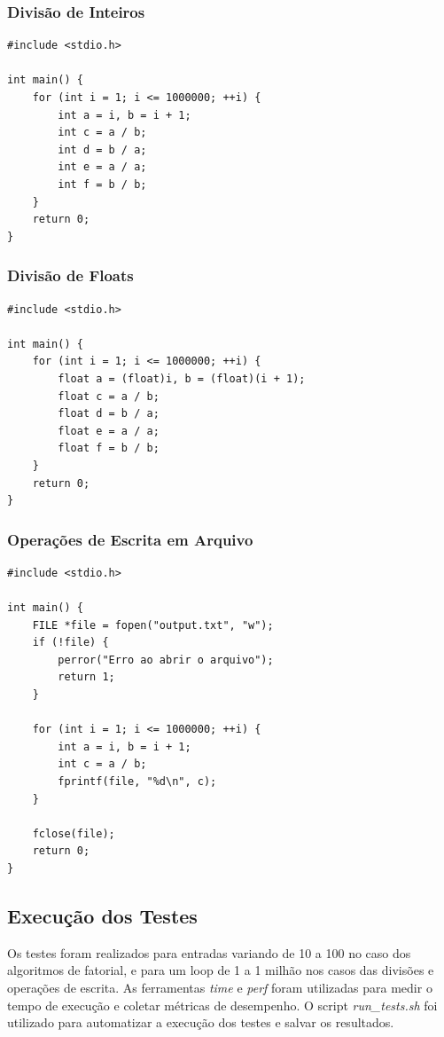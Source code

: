 \documentclass[12pt]{article}
\begin{document}
\subsubsection{Divisão de Inteiros}
\begin{verbatim}
#include <stdio.h>

int main() {
    for (int i = 1; i <= 1000000; ++i) {
        int a = i, b = i + 1;
        int c = a / b;
        int d = b / a;
        int e = a / a;
        int f = b / b;
    }
    return 0;
}
\end{verbatim}

\subsubsection{Divisão de Floats}
\begin{verbatim}
#include <stdio.h>

int main() {
    for (int i = 1; i <= 1000000; ++i) {
        float a = (float)i, b = (float)(i + 1);
        float c = a / b;
        float d = b / a;
        float e = a / a;
        float f = b / b;
    }
    return 0;
}
\end{verbatim}

\subsubsection{Operações de Escrita em Arquivo}
\begin{verbatim}
#include <stdio.h>

int main() {
    FILE *file = fopen("output.txt", "w");
    if (!file) {
        perror("Erro ao abrir o arquivo");
        return 1;
    }

    for (int i = 1; i <= 1000000; ++i) {
        int a = i, b = i + 1;
        int c = a / b;
        fprintf(file, "%d\n", c);
    }

    fclose(file);
    return 0;
}
\end{verbatim}

\subsection{Execução dos Testes}
Os testes foram realizados para entradas variando de 10 a 100 no caso dos algoritmos de fatorial, e para um loop de 1 a 1 milhão nos casos das divisões e operações de escrita. As ferramentas \textit{time} e \textit{perf} foram utilizadas para medir o tempo de execução e coletar métricas de desempenho. O script \textit{run\_tests.sh} foi utilizado para automatizar a execução dos testes e salvar os resultados.
\end{document}

